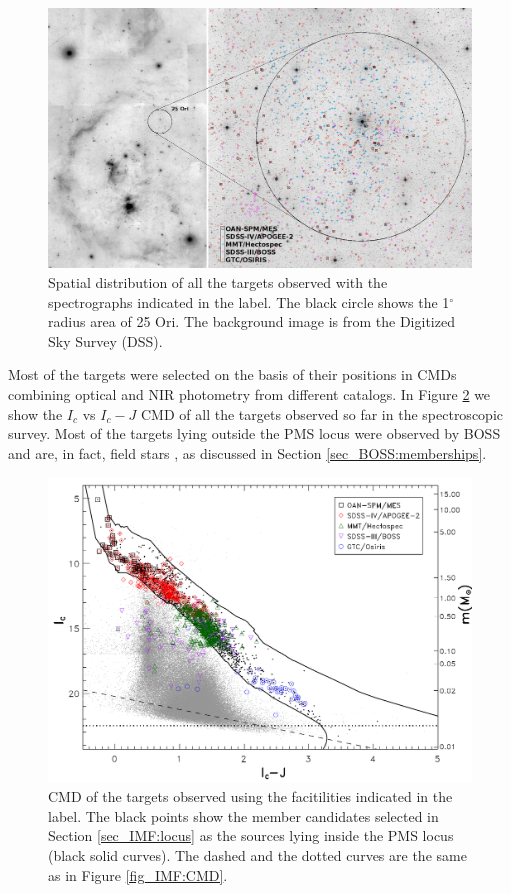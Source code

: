 \documentclass[12pt]{article}
\begin{document}
\begin{figure}[ht!]
	\includegraphics[width=1.0\textwidth]{sky_all_spectra.png}
	\caption[Spatial distribution of all the targets in our spectroscopic survey.]{Spatial distribution of all the targets observed with the spectrographs indicated in the label. The black circle shows the 1$^\circ$ radius area of 25 Ori. The background image is from the Digitized Sky Survey (DSS).}
	\label{fig:sky_all}
\end{figure}

Most of the targets were selected on the basis of their positions in CMDs combining optical and NIR photometry from different catalogs. In Figure \ref{fig:CMD_all} we show the $I_c$ vs $I_c-J$ CMD of all the targets observed so far in the spectroscopic survey. Most of the targets lying outside the PMS locus were observed by BOSS \citep{Alam2015} and are, in fact, field stars \citep{Suarez2017}, as discussed in Section \ref{sec_BOSS:memberships}.

\begin{figure}[ht!]
	\includegraphics[width=1.0\textwidth]{CMD_targets.pdf}
	\caption[CMD of the targets with spectra.]{CMD of the targets observed using the facitilities indicated in the label. The black points show the member candidates selected in Section \ref{sec_IMF:locus} as the sources lying inside the PMS locus (black solid curves). The dashed and the dotted curves are the same as in Figure \ref{fig_IMF:CMD}.}
	\label{fig:CMD_all}
\end{figure}
\end{document}
